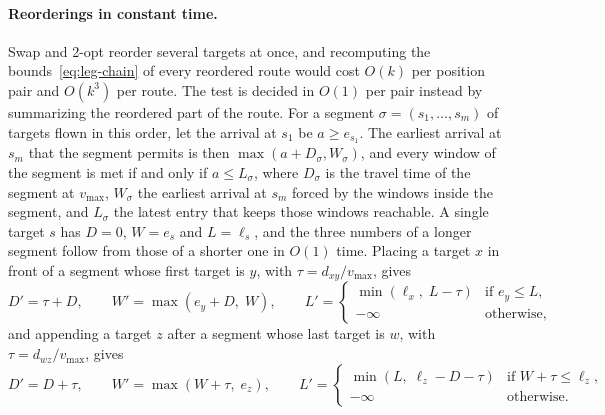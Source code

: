 \paragraph{Reorderings in constant time.}
Swap and 2-opt reorder several targets at once, and recomputing the bounds~\eqref{eq:leg-chain} of every reordered route would cost $O(k)$ per position pair and $O(k^3)$ per route. The test is decided in $O(1)$ per pair instead by summarizing the reordered part of the route. For a segment $\sigma = (s_1, \ldots, s_m)$ of targets flown in this order, let the arrival at $s_1$ be $a \ge e_{s_1}$. The earliest arrival at $s_m$ that the segment permits is then $\max(a + D_\sigma, W_\sigma)$, and every window of the segment is met if and only if $a \le L_\sigma$, where $D_\sigma$ is the travel time of the segment at $v_{\max}$, $W_\sigma$ the earliest arrival at $s_m$ forced by the windows inside the segment, and $L_\sigma$ the latest entry that keeps those windows reachable. A single target $s$ has $D = 0$, $W = e_s$ and $L = \ell_s$, and the three numbers of a longer segment follow from those of a shorter one in $O(1)$ time. Placing a target $x$ in front of a segment whose first target is $y$, with $\tau = d_{xy}/v_{\max}$, gives
\begin{equation}\label{eq:seg-prepend}
    D' = \tau + D, \qquad W' = \max(e_y + D,\; W), \qquad
    L' = \begin{cases} \min(\ell_x,\; L - \tau) & \text{if } e_y \le L, \\ -\infty & \text{otherwise,} \end{cases}
\end{equation}
and appending a target $z$ after a segment whose last target is $w$, with $\tau = d_{wz}/v_{\max}$, gives
\begin{equation}\label{eq:seg-append}
    D' = D + \tau, \qquad W' = \max(W + \tau,\; e_z), \qquad
    L' = \begin{cases} \min(L,\; \ell_z - D - \tau) & \text{if } W + \tau \le \ell_z, \\ -\infty & \text{otherwise.} \end{cases}
\end{equation}
